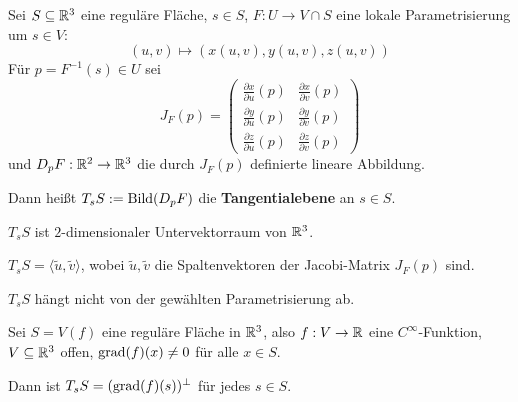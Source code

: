 \begin{definition}\label{def:Tangentialebene}%
    Sei $S \subseteq \mathbb{R}^3$ eine reguläre Fläche, $s \in S$,
    $F: U \rightarrow V \cap S$ eine lokale Parametrisierung um $s \in V$:
    \[(u,v) \mapsto (x(u,v), y(u,v), z(u,v))\]
    Für $p=F^{-1}(s) \in U$ sei
    \[        J_F(p) = \begin{pmatrix}
            \frac{\partial x}{\partial u} (p) & \frac{\partial x}{\partial v} (p)\\
            \frac{\partial y}{\partial u} (p) & \frac{\partial y}{\partial v} (p)\\
            \frac{\partial z}{\partial u} (p) & \frac{\partial z}{\partial v} (p)
        \end{pmatrix}\]
    und $D_p F: \mathbb{R}^2 \rightarrow \mathbb{R}^3$ die durch $J_F (p)$
    definierte lineare Abbildung.

    Dann heißt $T_s S := \operatorname{Bild}(D_p F)$ die \textbf{Tangentialebene}
    an $s \in S$.
\end{definition}

\begin{bemerkung}%
    \begin{bemenum}
        \item $T_s S$ ist $2$-dimensionaler Untervektorraum von $\mathbb{R}^3$.%
        \item $T_s S = \langle \tilde{u}, \tilde{v} \rangle$, wobei $\tilde{u}, \tilde{v}$
              die Spaltenvektoren der Jacobi-Matrix $J_F(p)$ sind.
        \item $T_s S$ hängt nicht von der gewählten Parametrisierung ab.%
        \item Sei $S=V(f)$ eine reguläre Fläche in $\mathbb{R}^3$, also %
                $f:V \rightarrow \mathbb{R}$ eine $C^\infty$-Funktion, $V \subseteq \mathbb{R}^3$
                offen, $\operatorname{grad}(f)(x) \neq 0$ für alle $x \in S$.

                Dann ist $T_s S = (\operatorname{grad}(f)(s))^\perp$ für jedes $s \in S$.
    \end{bemenum}
\end{bemerkung}

